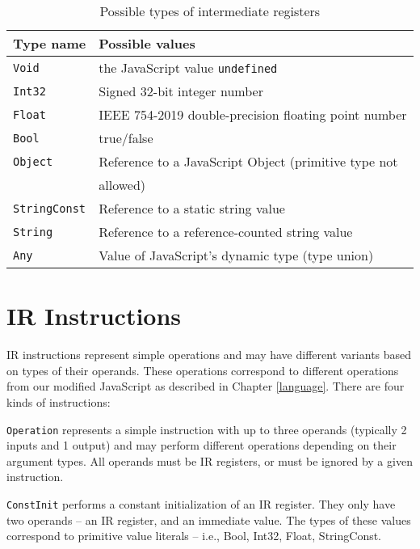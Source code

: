 \begin{table}[H]
    \centering
    \begin{tabular}{l | l}
        Type name   & Possible values                                                \\\hline
        \texttt{Void}        & the JavaScript value \texttt{undefined}                        \\
        \texttt{Int32}       & Signed 32-bit integer number                                   \\
        \texttt{Float}       & IEEE 754-2019 double-precision floating point number          \\
        \texttt{Bool}        & true/false                                                     \\
        \texttt{Object}      & Reference to a JavaScript Object (primitive type not \\
                             & allowed)  \\
        \texttt{StringConst} & Reference to a static string value                             \\
        \texttt{String}      & Reference to a reference-counted string value                  \\
        \texttt{Any}         & Value of JavaScript's dynamic type (type union)
    \end{tabular}
    \caption{Possible types of intermediate registers}
    \label{tab:types}
\end{table}


\section{IR Instructions}

IR instructions represent simple operations and may have different variants based on types of their operands. These operations correspond to different operations from our modified JavaScript as described in Chapter \ref{language}. There are four kinds of instructions:


\texttt{Operation} represents a simple instruction with up to three operands (typically 2 inputs and 1 output) and may perform different operations depending on their argument types. All operands must be IR registers, or must be ignored by a given instruction.

\texttt{ConstInit} performs a constant initialization of an IR register. They only have two operands -- an IR register, and an immediate value. The types of these values correspond to primitive value literals -- i.e., Bool, Int32, Float, StringConst.

